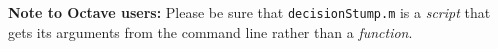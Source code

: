 \documentclass[11pt,addpoints,answers]{exam}
\numberwithin{equation}{section} %
\numberwithin{figure}{section} %
\numberwithin{table}{section} %
\begin{document}










\begin{notebox}
\textbf{Note to Octave users:} Please be sure that \texttt{decisionStump.m} is a \textit{script} that gets its arguments from the command line rather than a \textit{function}.
\end{notebox}
\end{document}
